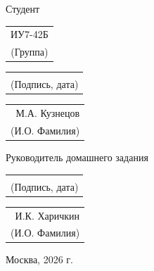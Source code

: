 \begin{titlepage}
    \vspace*{3cm}

    \begin{flushright}
        \begin{minipage}{1\textwidth}
            \large
            
            \small
            Студент 
            \begin{tabular}[t]{c}
                ИУ7-42Б \\
                {\footnotesize (Группа)}
            \end{tabular}
            \hfill
            \begin{tabular}[t]{p{3.5cm}}
                \underline{\hspace{3.5cm}} \\
                \centering\footnotesize (Подпись, дата)
            \end{tabular}
            \begin{tabular}[t]{r}
                М.А. Кузнецов \\
                {\footnotesize (И.О. Фамилия)}
            \end{tabular}

            \vspace*{1.0cm} %

            Руководитель домашнего задания 
            \hfill
            \begin{tabular}[t]{p{3.5cm}}
                \underline{\hspace{3.5cm}} \\
                \centering\footnotesize (Подпись, дата)
            \end{tabular}
            \begin{tabular}[t]{r}
                И.К. Харичкин \\
                \footnotesize (И.О. Фамилия)
            \end{tabular}
        \end{minipage}
    \end{flushright}

    \vfill

    \begin{center}
        {\large Москва, 2026 г.}
    \end{center}
\end{titlepage}
